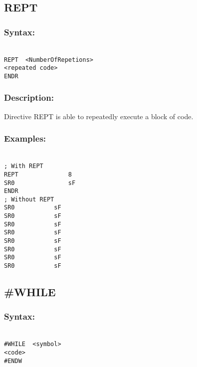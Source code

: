     \subsection{REPT}
        \subsubsection{Syntax:}
        {
            ~\\
            \usecodefont
            \verb'REPT  <NumberOfRepetions>'\\
            \verb'<repeated code>'\\
            \verb'ENDR'
        }

        \subsubsection{Description:}
            Directive REPT is able to repeatedly execute a block of code.

        \subsubsection{Examples:}
        {
            ~\\
            \usecodefont
                \verb'; With REPT'\\
                \verb'REPT              8'\\
                \verb'SR0               sF'\\
                \verb'ENDR'\\
                \verb'; Without REPT'\\
                \verb'SR0           sF'\\
                \verb'SR0           sF'\\
                \verb'SR0           sF'\\
                \verb'SR0           sF'\\
                \verb'SR0           sF'\\
                \verb'SR0           sF'\\
                \verb'SR0           sF'\\
                \verb'SR0           sF'\\
        }

    \subsection{\#WHILE}
        \subsubsection{Syntax:}
        {
            ~\\
            \usecodefont
            \verb'#WHILE  <symbol>'\\
            \verb'<code>'\\
            \verb'#ENDW'
        }

